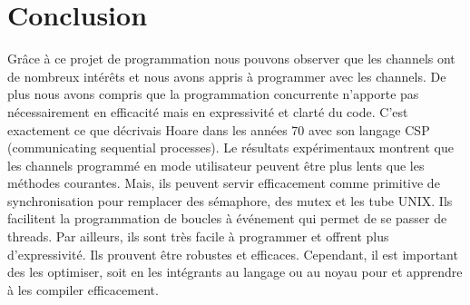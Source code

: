 \documentclass[a4paper]{report}
\begin{document}
\section{Conclusion}
Grâce à ce projet de programmation nous pouvons observer que les channels ont de nombreux intérêts et nous avons appris à programmer avec les channels. De plus nous avons compris que la programmation concurrente n'apporte pas nécessairement en efficacité mais en expressivité et clarté du code. C'est exactement ce que décrivais Hoare dans les années 70 avec son langage CSP (communicating sequential processes). Le résultats expérimentaux montrent que les channels programmé en mode utilisateur peuvent être plus lents que les méthodes courantes.  Mais, ils peuvent servir efficacement comme primitive de synchronisation pour remplacer des sémaphore, des mutex et les tube UNIX. Ils facilitent la programmation de boucles à événement qui permet de se passer de threads. Par ailleurs, ils sont très facile à programmer et offrent plus d'expressivité. Ils prouvent être robustes et efficaces. Cependant, il est important des les optimiser, soit en les intégrants au langage ou au noyau pour et apprendre à les compiler efficacement.  
\end{document}
